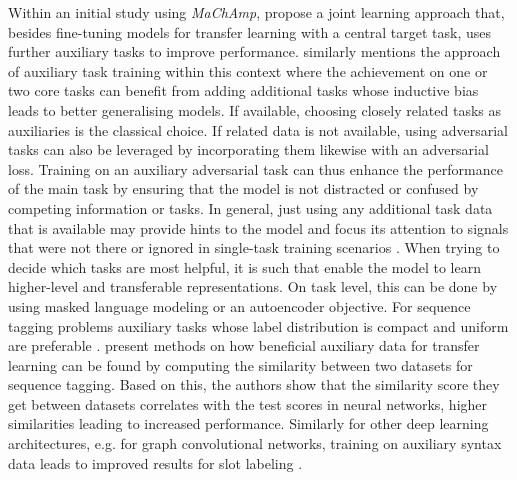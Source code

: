 \documentclass[11pt,a4paper,twoside,openright]{scrbook}
\begin{document}
Within an initial study using \textit{MaChAmp}, \citet{van-der-goot-etal-2021-masked} propose a joint learning approach that, besides fine-tuning models for transfer learning with a central target task, uses further auxiliary tasks to improve performance. \citet{ruder2017overviewmultitasklearningdeep} similarly mentions the approach of auxiliary task training within this context where the achievement on one or two core tasks can benefit from adding additional tasks whose inductive bias leads to better generalising models. If available, choosing closely related tasks as auxiliaries is the classical choice. If related data is not available, using adversarial tasks can also be leveraged by incorporating them likewise with an adversarial loss. Training on an auxiliary adversarial task can thus enhance the performance of the main task by ensuring that the model is not distracted or confused by competing information or tasks. In general, just using any additional task data that is available may provide hints to the model and focus its attention to signals that were not there or ignored in single-task training scenarios \citep{ruder2017overviewmultitasklearningdeep}. When trying to decide which tasks are most helpful, it is such that enable the model to learn higher-level and transferable representations. On task level, this can be done by using masked language modeling or an autoencoder objective. For sequence tagging problems auxiliary tasks whose label distribution is compact and uniform are preferable \citep{alonso2017-multitask}. \citet{schroder-biemann-2020-estimating} present methods on how beneficial auxiliary data for transfer learning can be found by computing the similarity between two datasets for sequence tagging. Based on this, the authors show that the similarity score they get between datasets correlates with the test scores in neural networks, higher similarities leading to increased performance. Similarly for other deep learning architectures, e.g. for graph convolutional networks, training on auxiliary syntax data leads to improved results for slot labeling \citep{qin2021multidomainspokenlanguageunderstanding}.
\end{document}

